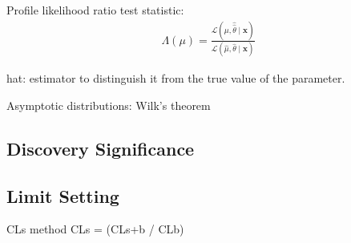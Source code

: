 Profile likelihood ratio test statistic:
\begin{align*}
  \Lambda(\mu) = \frac{\mathcal{L}\left( \mu, \hat{\hat{\theta}} \mid \mathbf{x} \right)}
                      {\mathcal{L}\left( \hat{\mu}, \hat{\theta} \mid \mathbf{x} \right)}
\end{align*}

hat: estimator to distinguish it from the true value of the parameter.

Asymptotic distributions: Wilk's theorem

\subsection{Discovery Significance}

\subsection{Limit Setting}

CLs method CLs = (CLs+b / CLb)

\cite{Read:2002hq}







